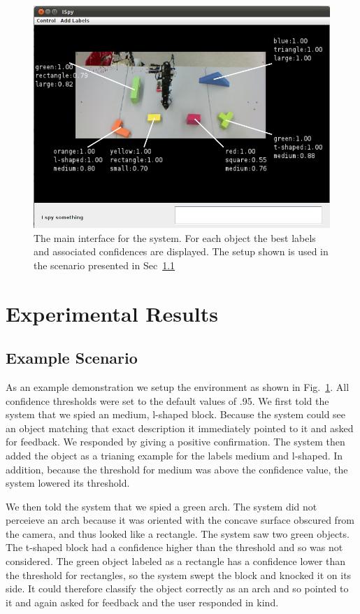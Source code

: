 \documentclass[11pt]{article}
\begin{document}
\begin{figure}[h!]
\centering
    \includegraphics[width=.75\textwidth]{figures/screenshot.png}
    \caption{The main interface for the system. For each object the best labels and associated confidences are displayed. The setup shown is used in the scenario presented in Sec~\ref{sec:scenario}}
    \label{fig:screenshot}
\end{figure}
\section{Experimental Results}

\subsection{Example Scenario}
\label{sec:scenario}
As an example demonstration we setup the environment as shown in Fig.~\ref{fig:screenshot}. All confidence thresholds were set to the default values of .95. We first told the system that we spied an medium, l-shaped block. Because the system could see an object matching that exact description it immediately pointed to it and asked for feedback. We responded by giving a positive confirmation. The system then added the object as a trianing example for the labels medium and l-shaped. In addition, because the threshold for medium was above the confidence value, the system lowered its threshold. 

We then told the system that we spied a green arch. The system did not perceieve an arch because it was oriented with the concave surface obscured from the camera, and thus looked like a rectangle. The system saw two green objects. The t-shaped block had a confidence higher than the threshold and so was not considered. The green object labeled as a rectangle has a confidence lower than the threshold for rectangles, so the system swept the block and knocked it on its side. It could therefore classify the object correctly as an arch and so pointed to it and again asked for feedback and the user responded in kind.
\end{document}
